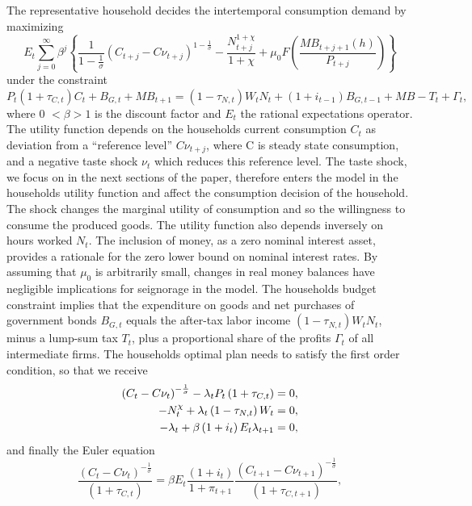 \documentclass[12pt,a4paper,oneside,titlepage]{article}
\begin{document}
The representative household decides the intertemporal consumption demand by maximizing
\begin{equation}
E_t \sum_{j=0}^\infty \beta^j \left\{ \frac{1}{1- \frac{1}{\sigma}} \left(C_{t+j} - C\nu_{t+j}\right)^{1-\frac{1}{\sigma}} - \frac{N_{t+j}^{1+\chi}}{1+\chi} + \mu_0F \left(\frac{MB_{t+j+1}(h)}{P_{t+j}}\right)\right\} \nonumber
\end{equation}
under the constraint\newline
$P_t(1+\tau_{C,t})C_t + B_{G,t} + MB_{t+1} = (1-\tau_{N,t})W_tN_t + (1+i_{t-1})B_{G,t-1} + MB-T_t + \Gamma_t,$
where 0 $< \beta > 1$ is the discount factor and $E_t$ the rational expectations operator. The utility function depends on the households current consumption $C_t$ as deviation from a “reference level” $C\nu_{t+j}$, where C is steady state consumption, and a negative taste shock $\nu_t$ which reduces this reference level. The taste shock, we focus on in the next sections of the paper, therefore enters the model in the households utility function and affect the consumption decision of the household. The shock changes the marginal utility of consumption and so the willingness to consume the produced goods.\newline
The utility function also depends inversely on hours worked $N_t$. The inclusion of money, as a zero nominal interest asset, provides a rationale for the zero lower bound on nominal interest rates. By assuming that $\mu_0$ is arbitrarily small, changes in real money balances have negligible implications for seignorage in the model. The households budget constraint implies that the expenditure on goods and net purchases of government bonds $B_{G,t}$ equals the after-tax labor income $ \left(1 - \tau_{N,t} \right) W_tN_t$, minus a lump-sum tax $T_t$, plus a proportional share of the profits $\Gamma_t$ of all intermediate firms. The households optimal plan needs to satisfy the first order condition, so that we receive
\begin{align}
\vspace{-0.5cm} \left(C_t - C\nu_t\right)^{-\frac{1}{\sigma}}  - \lambda_tP_t \left(1 + \tau_{C,t} \right) = 0,\nonumber\\
-N_t^{\chi} + \lambda_t \left(1 - \tau_{N,t} \right) W_t = 0,\nonumber\\
-\lambda_t + \beta \left(1 + i_t \right) E_t\lambda_{t+1} = 0,\nonumber
\end{align}
and finally the Euler equation
\begin{equation}
\frac {\left(C_t - C\nu_t\right)^{-\frac{1}{\sigma}}}{\left(1 + \tau_{C,t} \right)} = \beta E_t \frac{\left(1 + i_t \right)}{1 + \pi_{t+1}} \frac{\left(C_{t+1} - C\nu_{t+1}\right)^{-\frac{1}{\sigma}}}{\left(1+ \tau_{C,t+1}\right)},
\end{equation} 
\end{document}
